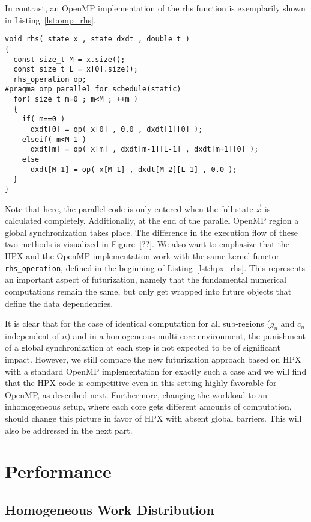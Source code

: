 \documentclass[10pt]{elsarticle}
\begin{document}
In contrast, an OpenMP implementation of the rhs function is exemplarily shown in Listing~\ref{lst:omp_rhs}.
\begin{lstlisting}[label=lst:omp_rhs,caption=OpenMP rhs function,float=t]
void rhs( state x , state dxdt , double t )
{
  const size_t M = x.size();
  const size_t L = x[0].size();
  rhs_operation op;
#pragma omp parallel for schedule(static)
  for( size_t m=0 ; m<M ; ++m )
  {
    if( m==0 )
      dxdt[0] = op( x[0] , 0.0 , dxdt[1][0] );
    elseif( m<M-1 )
      dxdt[m] = op( x[m] , dxdt[m-1][L-1] , dxdt[m+1][0] );
    else
      dxdt[M-1] = op( x[M-1] , dxdt[M-2][L-1] , 0.0 );
  }
}
\end{lstlisting}
Note that here, the parallel code is only entered when the full state $\vec x$ is calculated completely.
Additionally, at the end of the parallel OpenMP region a global synchronization takes place.
The difference in the execution flow of these two methods is visualized in Figure~\ref{??}.
We also want to emphasize that the HPX and the OpenMP implementation work with the same kernel functor \lstinline+rhs_operation+, defined in the beginning of Listing~\ref{lst:hpx_rhs}.
This represents an important aspect of futurization, namely that the fundamental numerical computations remain the same, but only get wrapped into future objects that define the data dependencies.

It is clear that for the case of identical computation for all sub-regions ($g_n$ and $c_n$ independent of $n$) and in a homogeneous multi-core environment, the punishment of a global synchronization at each step is not expected to be of significant impact.
However, we still compare the new futurization approach based on HPX with a standard OpenMP implementation for exactly such a case and we will find that the HPX code is competitive even in this setting highly favorable for OpenMP, as described next.
Furthermore, changing the workload to an inhomogeneous setup, where each core gets different amounts of computation, should change this picture in favor of HPX with absent global barriers.
This will also be addressed in the next part.

\section{Performance} \label{sec:perf}

\subsection{Homogeneous Work Distribution}
\end{document}
